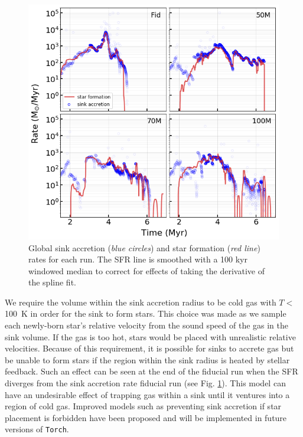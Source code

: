\documentclass[twoside]{drexel-thesis}
\begin{document}
\begin{thesis}
\begin{figure}[!htb]
	\includegraphics[width=\columnwidth]{sink_accr_star_formation_rates.png}
    \caption{Global sink accretion (\emph{blue circles}) and star formation (\emph{red line}) rates for each run. The SFR line is smoothed with a 100 kyr windowed median to correct for effects of taking the derivative of the spline fit.}
    \label{fig:sink_accretion_rate}
\end{figure}

We require the volume within the sink accretion radius to be cold gas with $T <$100~K in order for the sink to form stars. This choice was made as we sample each newly-born star's relative velocity from the sound speed of the gas in the sink volume. If the gas is too hot, stars would be placed with unrealistic relative velocities. Because of this requirement, it is possible for sinks to accrete gas but be unable to form stars if the region within the sink radius is heated by stellar feedback. Such an effect can be seen at the end of the fiducial run when the SFR diverges from the sink accretion rate fiducial run (see Fig. \ref{fig:sink_accretion_rate}). This model can have an undesirable effect of trapping gas within a sink until it ventures into a region of cold gas. Improved models such as preventing sink accretion if star placement is forbidden have been proposed and will be implemented in future versions of \texttt{Torch}.


\end{thesis}
\end{document}
